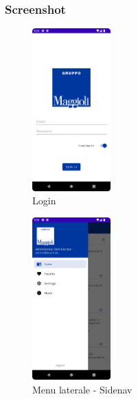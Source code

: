 \subsubsection*{Screenshot}
\begin{multicols}{3}
            \begin{figure}[H]
                \centering
                \includegraphics[width=0.27\textwidth]{img/login.png}
                \caption{Login}
                \label{login-android}
            \end{figure}

            \begin{figure}[H]
                \centering
                \includegraphics[width=0.27\textwidth]{img/sidenav.png}
                \caption{Menu laterale - Sidenav}
                \label{sidenav-android}
            \end{figure}
            

\end{multicols}
